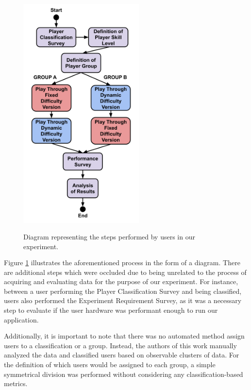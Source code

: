 \begin{figure}[!ht]
    \begin{center}
    \caption{Diagram representing the steps performed by users in our experiment.}
        \includegraphics[width=17em]{figures/fig-experiment-flow.png}
        \label{fig:experiment-flow}
    \end{center}
\end{figure}

Figure \ref{fig:experiment-flow} illustrates the aforementioned process in the form of a diagram. There are additional steps which were occluded due to being unrelated to the process of acquiring and evaluating data for the purpose of our experiment. For instance, between a user performing the Player Classification Survey and being classified, users also performed the Experiment Requirement Survey, as it was a necessary step to evaluate if the user hardware was performant enough to run our application.

Additionally, it is important to note that there was no automated method assign users to a classification or a group. Instead, the authors of this work manually analyzed the data and classified users based on observable clusters of data. For the definition of which users would be assigned to each group, a simple symmetrical division was performed without considering any classification-based metrics.

